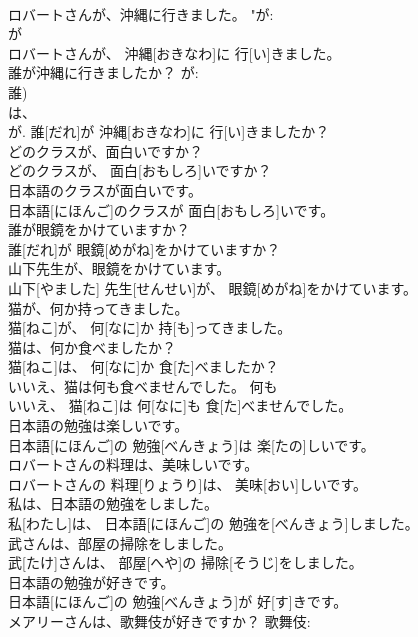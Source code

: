 \documentclass[8pt]{extreport}
\begin{document}
\begin{CJK}{UTF8}{min}
\\	ロバートさんが、沖縄に行きました。	"が: 
\\	が 
\\	ロバートさんが、 沖縄[おきなわ]に 行[い]きました。		
\\	誰が沖縄に行きましたか？	が: 
\\	誰) 
\\	は、
\\	が.	誰[だれ]が 沖縄[おきなわ]に 行[い]きましたか？		
\\	どのクラスが、面白いですか？	
\\	どのクラスが、 面白[おもしろ]いですか？	
\\	日本語のクラスが面白いです。	
\\	日本語[にほんご]のクラスが 面白[おもしろ]いです。	
\\	誰が眼鏡をかけていますか？	
\\	誰[だれ]が 眼鏡[めがね]をかけていますか？	
\\	山下先生が、眼鏡をかけています。	
\\	山下[やました] 先生[せんせい]が、 眼鏡[めがね]をかけています。	
\\	猫が、何か持ってきました。	
\\	猫[ねこ]が、 何[なに]か 持[も]ってきました。	
\\	猫は、何か食べましたか？	
\\	猫[ねこ]は、 何[なに]か 食[た]べましたか？	
\\	いいえ、猫は何も食べませんでした。	何も
\\	いいえ、 猫[ねこ]は 何[なに]も 食[た]べませんでした。	
\\	日本語の勉強は楽しいです。	
\\	日本語[にほんご]の 勉強[べんきょう]は 楽[たの]しいです。	
\\	ロバートさんの料理は、美味しいです。	
\\	ロバートさんの 料理[りょうり]は、 美味[おい]しいです。	
\\	私は、日本語の勉強をしました。	
\\	私[わたし]は、 日本語[にほんご]の 勉強を[べんきょう]しました。	
\\	武さんは、部屋の掃除をしました。	
\\	武[たけ]さんは、 部屋[へや]の 掃除[そうじ]をしました。	
\\	日本語の勉強が好きです。	
\\	日本語[にほんご]の 勉強[べんきょう]が 好[す]きです。	
\\	メアリーさんは、歌舞伎が好きですか？	歌舞伎: 

\end{CJK}
\end{document}
